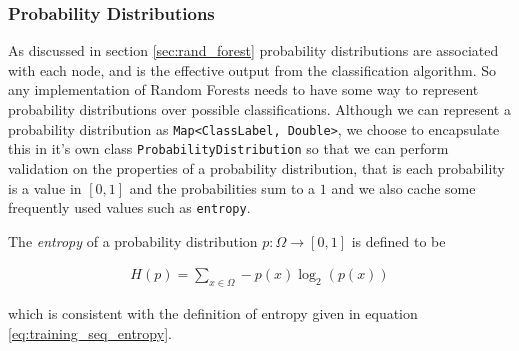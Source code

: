\documentclass[12pt,twoside,notitlepage]{report}
\begin{document}
            \subsubsection{Probability Distributions} \label{sec:prob_dist}
                As discussed in section \ref{sec:rand_forest} probability distributions are associated with each node, 
                and is the effective output from the classification algorithm. So any implementation of Random Forests 
                needs to have some way to represent probability distributions over possible classifications. Although 
                we can represent a probability distribution as \texttt{Map<ClassLabel, Double>}, we choose to 
                encapsulate this in it's own class \texttt{ProbabilityDistribution} so that we can perform validation
                on the properties of a probability distribution, that is each probability is a value in $[0,1]$ and 
                the probabilities sum to a $1$ and we also cache some frequently used values such as \texttt{entropy}. 

                The \textit{entropy} of a probability distribution $p:\Omega\rightarrow[0,1]$ is defined to be

                \begin{align}
                  H(p) = \sum\limits_{x\in\Omega} -p(x) \log_2(p(x))
                  \label{eq:prob_entropy}
                \end{align}

                which is consistent with the definition of entropy given in equation \ref{eq:training_seq_entropy}.
\end{document}

